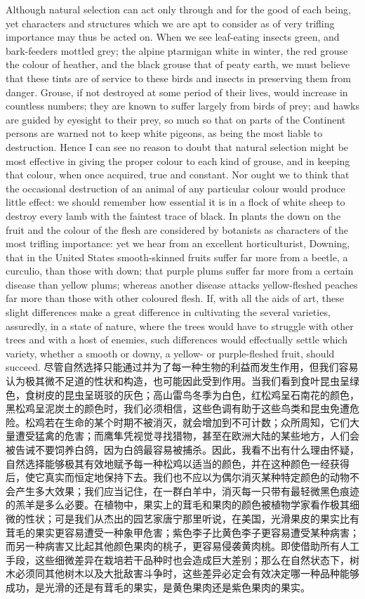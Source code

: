 \darwinpair
{Although natural selection can act only through and for the good of each being, yet characters and structures which we are apt to consider as of very trifling importance may thus be acted on. When we see leaf-eating insects green, and bark-feeders mottled grey; the alpine ptarmigan white in winter, the red grouse the colour of heather, and the black grouse that of peaty earth, we must believe that these tints are of service to these birds and insects in preserving them from danger. Grouse, if not destroyed at some period of their lives, would increase in countless numbers; they are known to suffer largely from birds of prey; and hawks are guided by eyesight to their prey, so much so that on parts of the Continent persons are warned not to keep white pigeons, as being the most liable to destruction. Hence I can see no reason to doubt that natural selection might be most effective in giving the proper colour to each kind of grouse, and in keeping that colour, when once acquired, true and constant. Nor ought we to think that the occasional destruction of an animal of any particular colour would produce little effect: we should remember how essential it is in a flock of white sheep to destroy every lamb with the faintest trace of black. In plants the down on the fruit and the colour of the flesh are considered by botanists as characters of the most trifling importance: yet we hear from an excellent horticulturist, Downing, that in the United States smooth-skinned fruits suffer far more from a beetle, a curculio, than those with down; that purple plums suffer far more from a certain disease than yellow plums; whereas another disease attacks yellow-fleshed peaches far more than those with other coloured flesh. If, with all the aids of art, these slight differences make a great difference in cultivating the several varieties, assuredly, in a state of nature, where the trees would have to struggle with other trees and with a host of enemies, such differences would effectually settle which variety, whether a smooth or downy, a yellow- or purple-fleshed fruit, should succeed.}
{尽管自然选择只能通过并为了每一种生物的利益而发生作用，但我们容易认为极其微不足道的性状和构造，也可能因此受到作用。当我们看到食叶昆虫呈绿色，食树皮的昆虫呈斑驳的灰色；高山雷鸟冬季为白色，红松鸡呈石南花的颜色，黑松鸡呈泥炭土的颜色时，我们必须相信，这些色调有助于这些鸟类和昆虫免遭危险。松鸡若在生命的某个时期不被消灭，就会增加到不可计数；众所周知，它们大量遭受猛禽的危害；而鹰隼凭视觉寻找猎物，甚至在欧洲大陆的某些地方，人们会被告诫不要饲养白鸽，因为白鸽最容易被捕杀。因此，我看不出有什么理由怀疑，自然选择能够极其有效地赋予每一种松鸡以适当的颜色，并在这种颜色一经获得后，使它真实而恒定地保持下去。我们也不应以为偶尔消灭某种特定颜色的动物不会产生多大效果；我们应当记住，在一群白羊中，消灭每一只带有最轻微黑色痕迹的羔羊是多么必要。在植物中，果实上的茸毛和果肉的颜色被植物学家看作极其细微的性状；可是我们从杰出的园艺家唐宁那里听说，在美国，光滑果皮的果实比有茸毛的果实更容易遭受一种象甲危害；紫色李子比黄色李子更容易遭受某种病害；而另一种病害又比起其他颜色果肉的桃子，更容易侵袭黄肉桃。即使借助所有人工手段，这些细微差异在栽培若干品种时也会造成巨大差别；那么在自然状态下，树木必须同其他树木以及大批敌害斗争时，这些差异必定会有效决定哪一种品种能够成功，是光滑的还是有茸毛的果实，是黄色果肉还是紫色果肉的果实。}

